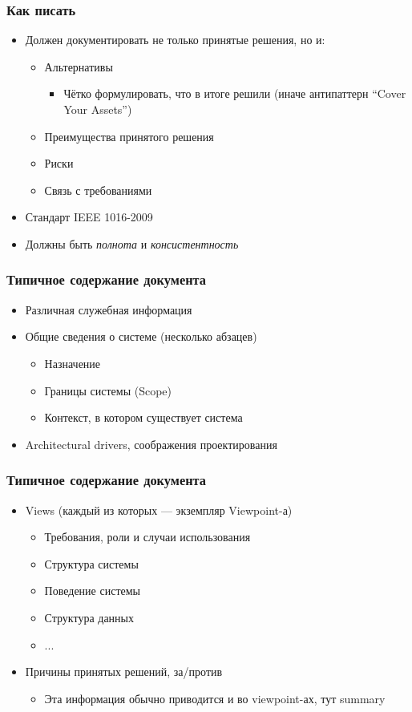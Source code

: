 \documentclass[xetex,mathserif,serif]{beamer}
\begin{document}
	\begin{frame}
		\frametitle{Как писать}
		\begin{itemize}
			\item Должен документировать не только принятые решения, но и:
			\begin{itemize}
				\item Альтернативы
				\begin{itemize}
					\item Чётко формулировать, что в итоге решили (иначе антипаттерн ``Cover Your Assets'')
				\end{itemize}
				\item Преимущества принятого решения
				\item Риски
				\item Связь с требованиями
			\end{itemize}
			\item Стандарт IEEE 1016-2009
			\item Должны быть \textit{полнота} и \textit{консистентность}
		\end{itemize}
	\end{frame}

	\begin{frame}
		\frametitle{Типичное содержание документа}
		\begin{itemize}
			\item Различная служебная информация
			\item Общие сведения о системе (несколько абзацев)
			\begin{itemize}
				\item Назначение
				\item Границы системы (Scope)
				\item Контекст, в котором существует система
			\end{itemize}
			\item Architectural drivers, соображения проектирования
		\end{itemize}
	\end{frame}

	\begin{frame}
		\frametitle{Типичное содержание документа}
		\begin{itemize}
			\item Views (каждый из которых --- экземпляр Viewpoint-а)
			\begin{itemize}
				\item Требования, роли и случаи использования
				\item Структура системы
				\item Поведение системы
				\item Структура данных
				\item ...
			\end{itemize}
			\item Причины принятых решений, за/против
			\begin{itemize}
				\item Эта информация обычно приводится и во viewpoint-ах, тут summary
			\end{itemize}
		\end{itemize}
	\end{frame}
\end{document}
